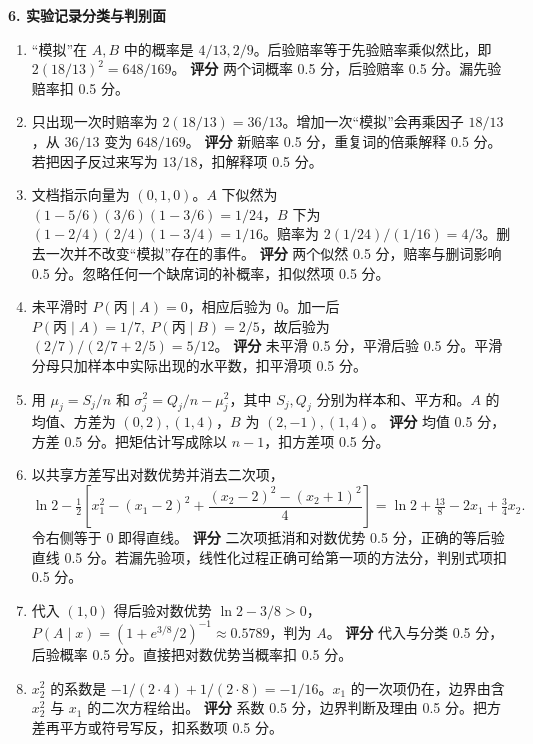 \noindent\textbf{6. 实验记录分类与判别面}
\begin{enumerate}[label=(\arabic*)]
\item “模拟”在 $A,B$ 中的概率是 $4/13,2/9$。后验赔率等于先验赔率乘似然比，即 $2(18/13)^2=648/169$。
\textbf{评分} 两个词概率 0.5 分，后验赔率 0.5 分。漏先验赔率扣 0.5 分。
\item 只出现一次时赔率为 $2(18/13)=36/13$。增加一次“模拟”会再乘因子 $18/13$，从 $36/13$ 变为 $648/169$。
\textbf{评分} 新赔率 0.5 分，重复词的倍乘解释 0.5 分。若把因子反过来写为 $13/18$，扣解释项 0.5 分。
\item 文档指示向量为 $(0,1,0)$。$A$ 下似然为 $(1-5/6)(3/6)(1-3/6)=1/24$，$B$ 下为 $(1-2/4)(2/4)(1-3/4)=1/16$。赔率为 $2(1/24)/(1/16)=4/3$。删去一次并不改变“模拟”存在的事件。
\textbf{评分} 两个似然 0.5 分，赔率与删词影响 0.5 分。忽略任何一个缺席词的补概率，扣似然项 0.5 分。
\item 未平滑时 $P(\text{丙}\mid A)=0$，相应后验为 0。加一后 $P(\text{丙}\mid A)=1/7,\ P(\text{丙}\mid B)=2/5$，故后验为 $(2/7)/(2/7+2/5)=5/12$。
\textbf{评分} 未平滑 0.5 分，平滑后验 0.5 分。平滑分母只加样本中实际出现的水平数，扣平滑项 0.5 分。
\item 用 $\mu_j=S_j/n$ 和 $\sigma_j^2=Q_j/n-\mu_j^2$，其中 $S_j,Q_j$ 分别为样本和、平方和。$A$ 的均值、方差为 $(0,2),(1,4)$，$B$ 为 $(2,-1),(1,4)$。
\textbf{评分} 均值 0.5 分，方差 0.5 分。把矩估计写成除以 $n-1$，扣方差项 0.5 分。
\item 以共享方差写出对数优势并消去二次项，
\[
 \ln 2-\tfrac12\!\left[
 x_1^2-(x_1-2)^2+\frac{(x_2-2)^2-(x_2+1)^2}{4}
 \right]
 =\ln 2+\tfrac{13}{8}-2x_1+\tfrac34 x_2.
\]
令右侧等于 0 即得直线。
\textbf{评分} 二次项抵消和对数优势 0.5 分，正确的等后验直线 0.5 分。若漏先验项，线性化过程正确可给第一项的方法分，判别式项扣 0.5 分。
\item 代入 $(1,0)$ 得后验对数优势 $\ln 2-3/8>0$，$P(A\mid x)=(1+e^{3/8}/2)^{-1}\approx0.5789$，判为 $A$。
\textbf{评分} 代入与分类 0.5 分，后验概率 0.5 分。直接把对数优势当概率扣 0.5 分。
\item $x_2^2$ 的系数是 $-1/(2\cdot4)+1/(2\cdot8)=-1/16$。$x_1$ 的一次项仍在，边界由含 $x_2^2$ 与 $x_1$ 的二次方程给出。
\textbf{评分} 系数 0.5 分，边界判断及理由 0.5 分。把方差再平方或符号写反，扣系数项 0.5 分。
\end{enumerate}

